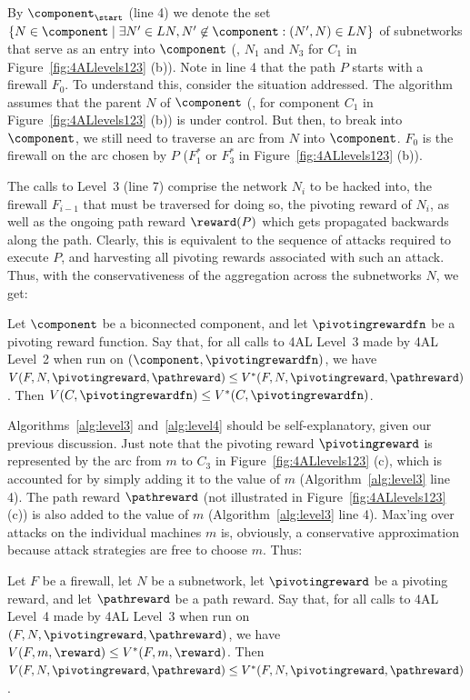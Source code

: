 By $\component_\start$ (line 4) we denote the set $\{N \in \component
\mid \exists N' \in LN, N' \not \in \component: (N',N) \in LN\}$ of
subnetworks that serve as an entry into $\component$ (\eg, $N_1$ and
$N_3$ for $C_1$ in Figure~\ref{fig:4ALlevels123} (b)).  Note in line 4
that the path $P$ starts with a firewall $F_0$. To understand this,
consider the situation addressed. The algorithm assumes that the
parent $N$ of $\component$ (\start, for component $C_1$ in
Figure~\ref{fig:4ALlevels123} (b)) is under control. But then, to
break into $\component$, we still need to traverse an arc from $N$
into $\component$. $F_0$ is the firewall on the arc chosen by $P$
($F^*_1$ or $F^*_3$ in Figure~\ref{fig:4ALlevels123} (b)).

The calls to Level~3 (line 7) comprise the network $N_i$ to be hacked
into, the firewall $F_{i-1}$ that must be traversed for doing so, the
pivoting reward of $N_i$, as well as the ongoing path reward
$\reward(P)$ which gets propagated backwards along the path. Clearly,
this is equivalent to the sequence of attacks required to execute $P$,
and harvesting all pivoting rewards associated with such an
attack. Thus, with the conservativeness of the aggregation across the
subnetworks $N$, we get:

\begin{proposition}\label{pro:level2conservative} 
Let $\component$ be a biconnected component, and let
$\pivotingrewardfn$ be a pivoting reward function. Say that, for all
calls to 4AL Level~3 made by 4AL Level~2 when run on
$(\component,\pivotingrewardfn)$, we have
$V(F,N,\pivotingreward,\pathreward) \leq
V^*(F,N,\pivotingreward,\pathreward)$. Then $V(C,\pivotingrewardfn)
\leq V^*(C,\pivotingrewardfn)$.
\end{proposition}


Algorithms~\ref{alg:level3} and~\ref{alg:level4} should be
self-explanatory, given our previous discussion. Just note that the
pivoting reward $\pivotingreward$ is represented by the arc from $m$
to $C_3$ in Figure~\ref{fig:4ALlevels123} (c), which is accounted for
by simply adding it to the value of $m$ (Algorithm~\ref{alg:level3}
line 4). The path reward $\pathreward$ (not illustrated in
Figure~\ref{fig:4ALlevels123} (c)) is also added to the value of $m$
(Algorithm~\ref{alg:level3} line 4). Max'ing over attacks on the
individual machines $m$ is, obviously, a conservative approximation
because attack strategies are free to choose $m$. Thus:

\begin{proposition}\label{pro:level3conservative} 
Let $F$ be a firewall, let $N$ be a subnetwork, let $\pivotingreward$
be a pivoting reward, and let $\pathreward$ be a path reward. Say
that, for all calls to 4AL Level~4 made by 4AL Level~3 when run on
$(F,N,\pivotingreward,\pathreward)$, we have $V(F,m,\reward) \leq
V^*(F,m,\reward)$. Then $V(F,N,\pivotingreward,\pathreward) \leq
V^*(F,N,\pivotingreward,\pathreward)$.
\end{proposition}











